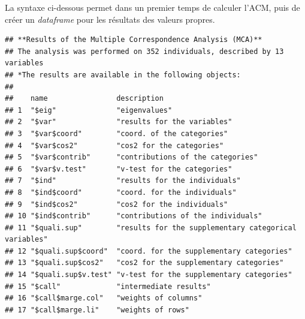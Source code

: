 \documentclass[
  11pt,
  french,
]{book}
\makeatletter
\newenvironment{Shaded}{\begin{snugshade}}{\end{snugshade}}
\newcommand{\CommentTok}[1]{\textcolor[rgb]{0.56,0.35,0.01}{\textit{#1}}}
\newcommand{\DataTypeTok}[1]{\textcolor[rgb]{0.13,0.29,0.53}{#1}}
\newcommand{\DecValTok}[1]{\textcolor[rgb]{0.00,0.00,0.81}{#1}}
\newcommand{\KeywordTok}[1]{\textcolor[rgb]{0.13,0.29,0.53}{\textbf{#1}}}
\newcommand{\NormalTok}[1]{#1}
\newcommand{\OperatorTok}[1]{\textcolor[rgb]{0.81,0.36,0.00}{\textbf{#1}}}
\newcommand{\OtherTok}[1]{\textcolor[rgb]{0.56,0.35,0.01}{#1}}
\newcommand{\StringTok}[1]{\textcolor[rgb]{0.31,0.60,0.02}{#1}}
\newenvironment{kframe}{%
\medskip{}
\setlength{\fboxsep}{.8em}
 \def\at@end@of@kframe{}%
 \ifinner\ifhmode%
  \def\at@end@of@kframe{\end{minipage}}%
  \begin{minipage}{\columnwidth}%
 \fi\fi%
 \def\FrameCommand##1{\hskip\@totalleftmargin \hskip-\fboxsep
 \colorbox{shadecolor}{##1}\hskip-\fboxsep
     \hskip-\linewidth \hskip-\@totalleftmargin \hskip\columnwidth}%
 \MakeFramed {\advance\hsize-\width
   \@totalleftmargin\z@ \linewidth\hsize
   \@setminipage}}%
 {\par\unskip\endMakeFramed%
 \at@end@of@kframe}
\renewenvironment{Shaded}{\begin{kframe}}{\end{kframe}}
\makeatother
\begin{document}
La syntaxe ci-dessous permet dans un premier temps de calculer l'ACM, puis de créer un \emph{dataframe} pour les résultats des valeurs propres.

\begin{Shaded}
\end{Shaded}

\begin{verbatim}
## **Results of the Multiple Correspondence Analysis (MCA)**
## The analysis was performed on 352 individuals, described by 13 variables
## *The results are available in the following objects:
## 
##    name                description                                          
## 1  "$eig"              "eigenvalues"                                        
## 2  "$var"              "results for the variables"                          
## 3  "$var$coord"        "coord. of the categories"                           
## 4  "$var$cos2"         "cos2 for the categories"                            
## 5  "$var$contrib"      "contributions of the categories"                    
## 6  "$var$v.test"       "v-test for the categories"                          
## 7  "$ind"              "results for the individuals"                        
## 8  "$ind$coord"        "coord. for the individuals"                         
## 9  "$ind$cos2"         "cos2 for the individuals"                           
## 10 "$ind$contrib"      "contributions of the individuals"                   
## 11 "$quali.sup"        "results for the supplementary categorical variables"
## 12 "$quali.sup$coord"  "coord. for the supplementary categories"            
## 13 "$quali.sup$cos2"   "cos2 for the supplementary categories"              
## 14 "$quali.sup$v.test" "v-test for the supplementary categories"            
## 15 "$call"             "intermediate results"                               
## 16 "$call$marge.col"   "weights of columns"                                 
## 17 "$call$marge.li"    "weights of rows"
\end{verbatim}
\end{document}
